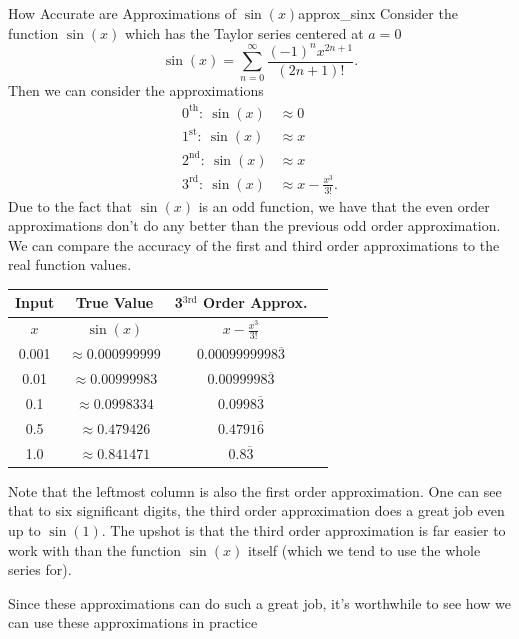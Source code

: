 \begin{ex}{How Accurate are Approximations of $\sin(x)$}{approx_sinx}
Consider the function $\sin(x)$ which has the Taylor series centered at $a=0$ 
\[
\sin(x) = \sum_{n=0}^\infty \frac{(-1)^n x^{2n+1}}{(2n+1)!}.
\]
Then we can consider the approximations
\begin{align*}
    0^\textrm{th}:~\sin(x)&\approx 0\\
    1^\textrm{st}:~\sin(x)&\approx x\\
    2^\textrm{nd}:~\sin(x)&\approx x\\
    3^\textrm{rd}:~\sin(x)&\approx x-\frac{x^3}{3!}.
\end{align*}
Due to the fact that $\sin(x)$ is an odd function, we have that the even order approximations don't do any better than the previous odd order approximation.  We can compare the accuracy of the first and third order approximations to the real function values. 
    \begin{table}[H]
        \centering
        \renewcommand{\arraystretch}{1.5}
        \begin{tabular}{c|c|c|c}
            Input & True Value & 3$^\textrm{3rd}$ Order Approx.\\
            \hline
            $x$ & $\sin(x)$ & $x-\frac{x^3}{3!}$\\
            \hline
            0.001 & $\approx 0.000999999$ & $0.0009999998\overline{3}$\\
            \hline
            0.01 &  $\approx 0.00999983$ & $0.0099998\overline{3}$\\
            \hline
            0.1 &  $\approx 0.0998334$ & $0.0998\overline{3}$\\
            \hline
            0.5 & $\approx 0.479426$ & $0.4791\overline{6}$\\
            \hline
            1.0 & $\approx 0.841471$ & $0.8\overline{3}$
        \end{tabular}
        \label{tab:sin_approx}
    \end{table}
    Note that the leftmost column is also the first order approximation. One can see that to six significant digits, the third order approximation does a great job even up to $\sin(1)$.  The upshot is that the third order approximation is far easier to work with than the function $\sin(x)$ itself (which we tend to use the whole series for).
\end{ex}

Since these approximations can do such a great job, it's worthwhile to see how we can use these approximations in practice

